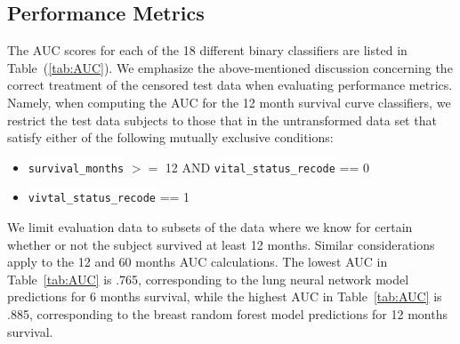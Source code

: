 \documentclass[10pt,letterpaper]{article}
\newcommand{\codewhite}[1]{\colorbox{white}{\texttt{#1}}}
\begin{document}
\subsection*{Performance Metrics}
\label{sec:performancemetrics}



The AUC scores for each of the 18 different binary classifiers are listed in Table~(\ref{tab:AUC}). We emphasize the above-mentioned discussion concerning the correct treatment of the censored test data when evaluating performance metrics.
Namely, when computing the AUC for the 12 month survival curve classifiers, we restrict the test data subjects to those that in the untransformed data set that satisfy either of the following mutually exclusive conditions:



\begin{itemize}[noitemsep]
\item \codewhite{survival\_months} $>=$ 12 AND \codewhite{vital\_status\_recode} == 0
\item \codewhite{vivtal\_status\_recode} == 1
\end{itemize}

We limit evaluation data to subsets of the data where we know for certain whether or not the subject survived at least 12 months. Similar considerations apply to the 12 and 60 months AUC calculations. The lowest AUC in Table~\ref{tab:AUC} is .765, corresponding to the lung neural network model predictions for 6 months survival, while the highest AUC in Table~\ref{tab:AUC} is .885, corresponding to the breast random forest model predictions for 12 months survival.
\end{document}

